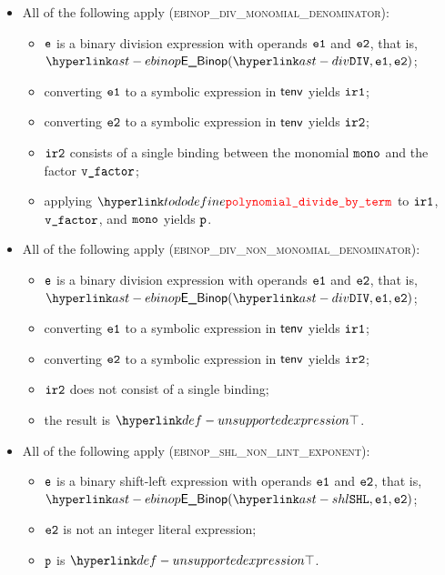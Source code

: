 \begin{itemize}
  \item All of the following apply (\textsc{ebinop\_div\_monomial\_denominator}):
  \begin{itemize}
    \item $\texttt{e}$ is a binary division expression with operands $\texttt{e1}$ and $\texttt{e2}$, that is, \\ $\EBinop(\DIV, \veone, \vetwo)$;
    \item converting $\texttt{e1}$ to a symbolic expression in $\textsf{tenv}$ yields $\texttt{ir1}$\ProseOrTypeErrorOrCannotBeTransformed;
    \item converting $\texttt{e2}$ to a symbolic expression in $\textsf{tenv}$ yields $\texttt{ir2}$\ProseOrTypeErrorOrCannotBeTransformed;
    \item $\texttt{ir2}$ consists of a single binding between the monomial $\texttt{mono}$ and the factor $\texttt{v\_factor}$;
    \item applying $\polynomialdividebyterm$ to $\texttt{ir1}$, $\texttt{v\_factor}$, and $\texttt{mono}$ yields $\texttt{p}$\ProseTerminateAs{\CannotBeTransformed}.
  \end{itemize}

  \item All of the following apply (\textsc{ebinop\_div\_non\_monomial\_denominator}):
  \begin{itemize}
    \item $\texttt{e}$ is a binary division expression with operands $\texttt{e1}$ and $\texttt{e2}$, that is, \\ $\EBinop(\DIV, \veone, \vetwo)$;
    \item converting $\texttt{e1}$ to a symbolic expression in $\textsf{tenv}$ yields $\texttt{ir1}$\ProseOrTypeErrorOrCannotBeTransformed;
    \item converting $\texttt{e2}$ to a symbolic expression in $\textsf{tenv}$ yields $\texttt{ir2}$\ProseOrTypeErrorOrCannotBeTransformed;
    \item $\texttt{ir2}$ does not consist of a single binding;
    \item the result is $\CannotBeTransformed$.
  \end{itemize}

  \item All of the following apply (\textsc{ebinop\_shl\_non\_lint\_exponent}):
  \begin{itemize}
    \item $\texttt{e}$ is a binary shift-left expression with operands $\texttt{e1}$ and $\texttt{e2}$, that is, \\ $\EBinop(\SHL, \veone, \vetwo)$;
    \item $\texttt{e2}$ is not an integer literal expression;
    \item $\texttt{p}$ is $\CannotBeTransformed$.
  \end{itemize}


\end{itemize}
